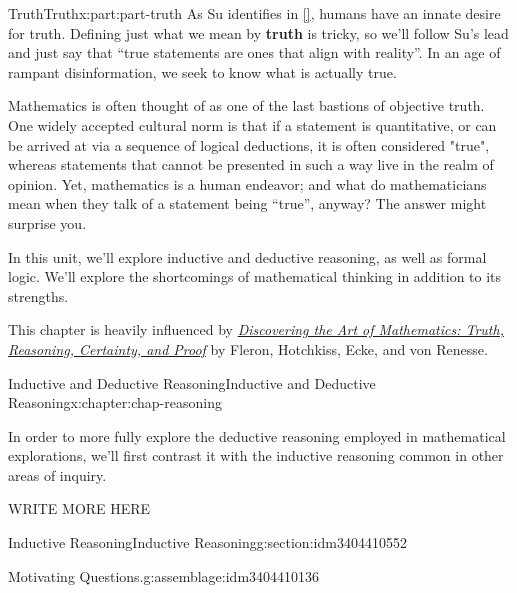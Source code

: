 \documentclass[oneside,10pt,]{book}
\newcommand{\xreffont}{\relax}
\newcommand{\terminology}[1]{\textbf{#1}}
\numberwithin{equation}{section}
\begin{document}
\begin{partptx}{Truth}{}{Truth}{}{}{x:part:part-truth}
 As Su identifies in \hyperlink{x:biblio:Su2020}{[{\xreffont 1}]}, humans have an innate desire for truth. Defining just what we mean by \terminology{truth} is tricky, so we'll follow Su's lead and just say that ``true statements are ones that align with reality''. In an age of rampant disinformation, we seek to know what is actually true.%
\par
Mathematics is often thought of as one of the last bastions of objective truth. One widely accepted cultural norm is that if a statement is quantitative, or can be arrived at via a sequence of logical deductions, it is often considered "true", whereas statements that cannot be presented in such a way live in the realm of opinion. Yet, mathematics is a human endeavor; and what do mathematicians mean when they talk of a statement being ``true'', anyway? The answer might surprise you.%
\par
In this unit, we'll explore inductive and deductive reasoning, as well as formal logic. We'll explore the shortcomings of mathematical thinking in addition to its strengths.%
\par
This chapter is heavily influenced by \emph{\href{https://www.artofmathematics.org/books/truth-reasoning-certainty-and-proof}{Discovering the Art of Mathematics: Truth, Reasoning, Certainty, and Proof}} by Fleron, Hotchkiss, Ecke, and von Renesse.%
%
\typeout{************************************************}
\typeout{************************************************}
%
\begin{chapterptx}{Inductive and Deductive Reasoning}{}{Inductive and Deductive Reasoning}{}{}{x:chapter:chap-reasoning}
\begin{introduction}{}%
In order to  more fully explore the deductive reasoning employed in mathematical explorations, we'll first contrast it with the inductive reasoning common in other areas of inquiry.%
\par
WRITE MORE HERE%
\end{introduction}%
%
%
\typeout{************************************************}
\typeout{************************************************}
%
\begin{sectionptx}{Inductive Reasoning}{}{Inductive Reasoning}{}{}{g:section:idm3404410552}
\begin{assemblage}{Motivating Questions.}{g:assemblage:idm3404410136}%

\end{assemblage}
\end{sectionptx}
\end{chapterptx}
\end{partptx}
\end{document}
